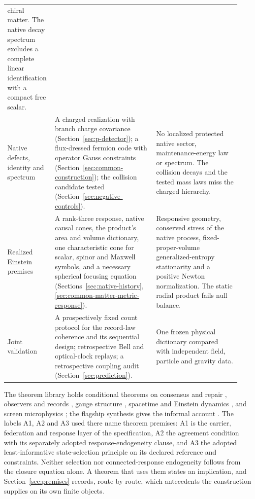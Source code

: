 \documentclass[11pt]{article}
\theoremstyle{definition}
\theoremstyle{remark}
\theoremstyle{plain}
\begin{document}
{\begin{longtable}{@{}L{0.17\linewidth}L{0.42\linewidth}L{0.35\linewidth}@{}}
chiral matter. The native decay spectrum excludes a complete linear
identification with a compact free scalar.\\
\addlinespace
Native defects, identity and spectrum &
A charged realization with branch charge covariance
(Section~\ref{sec:p-detector}); a flux-dressed fermion code with operator
Gauss constraints (Section~\ref{sec:common-construction}); the collision
candidate tested (Section~\ref{sec:negative-controls}). &
No localized protected native sector, maintenance-energy law or spectrum.
The collision decays and the tested mass laws miss the charged hierarchy.\\
\addlinespace
Realized Einstein premises &
A rank-three response, native causal cones, the product's area and volume
dictionary, one characteristic cone for scalar, spinor and Maxwell symbols,
and a necessary spherical focusing equation
(Sections~\ref{sec:native-history},
\ref{sec:common-matter-metric-response}). &
Responsive geometry, conserved stress of the native process,
fixed-proper-volume generalized-entropy stationarity and a positive Newton
normalization. The static radial product fails null balance.\\
\addlinespace
Joint validation &
A prospectively fixed count protocol for the record-law coherence and its
sequential design; retrospective Bell and optical-clock replays; a
retrospective coupling audit (Section~\ref{sec:prediction}). &
One frozen physical dictionary compared with independent field, particle
and gravity data.\\
\bottomrule
\end{longtable}
}

The theorem library holds conditional theorems on consensus and repair
\cite{ophconsensus}, observers and records \cite{ophobservers}, gauge
structure \cite{ophgauge}, spacetime and Einstein dynamics
\cite{ophspacetime}, and screen microphysics \cite{ophmicro}; the flagship
synthesis gives the informal account \cite{flagship}. The labels A1, A2 and
A3 used there name theorem premises: A1 is the carrier, federation and
response layer of the specification, A2 the agreement condition with its
separately adopted response-endogeneity clause, and A3 the adopted
least-informative state-selection principle on its declared reference and
constraints. Neither selection nor connected-response endogeneity follows
from the closure equation alone. A theorem that uses them states an implication, and
Section~\ref{sec:premises} records, route by route, which antecedents the
construction supplies on its own finite objects.
\end{document}
